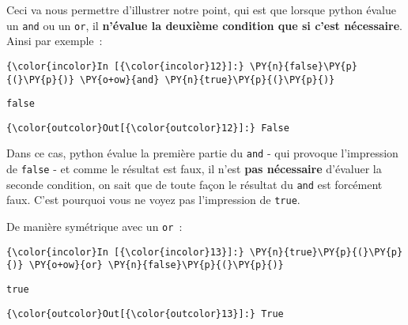     Ceci va nous permettre d'illustrer notre point, qui est que lorsque
python évalue un \texttt{and} ou un \texttt{or}, il \textbf{n'évalue la
deuxième condition que si c'est nécessaire}. Ainsi par exemple~:

    \begin{Verbatim}[commandchars=\\\{\},frame=single,framerule=0.3mm,rulecolor=\color{cellframecolor}]
{\color{incolor}In [{\color{incolor}12}]:} \PY{n}{false}\PY{p}{(}\PY{p}{)} \PY{o+ow}{and} \PY{n}{true}\PY{p}{(}\PY{p}{)}
\end{Verbatim}


    \begin{Verbatim}[commandchars=\\\{\},frame=single,framerule=0.3mm,rulecolor=\color{cellframecolor}]
false
\end{Verbatim}

\begin{Verbatim}[commandchars=\\\{\},frame=single,framerule=0.3mm,rulecolor=\color{cellframecolor}]
{\color{outcolor}Out[{\color{outcolor}12}]:} False
\end{Verbatim}
            
    Dans ce cas, python évalue la première partie du \texttt{and} - qui
provoque l'impression de \texttt{false} - et comme le résultat est faux,
il n'est \textbf{pas nécessaire} d'évaluer la seconde condition, on sait
que de toute façon le résultat du \texttt{and} est forcément faux. C'est
pourquoi vous ne voyez pas l'impression de \texttt{true}.

    De manière symétrique avec un \texttt{or}~:

    \begin{Verbatim}[commandchars=\\\{\},frame=single,framerule=0.3mm,rulecolor=\color{cellframecolor}]
{\color{incolor}In [{\color{incolor}13}]:} \PY{n}{true}\PY{p}{(}\PY{p}{)} \PY{o+ow}{or} \PY{n}{false}\PY{p}{(}\PY{p}{)}
\end{Verbatim}


    \begin{Verbatim}[commandchars=\\\{\},frame=single,framerule=0.3mm,rulecolor=\color{cellframecolor}]
true
\end{Verbatim}

\begin{Verbatim}[commandchars=\\\{\},frame=single,framerule=0.3mm,rulecolor=\color{cellframecolor}]
{\color{outcolor}Out[{\color{outcolor}13}]:} True
\end{Verbatim}
            
